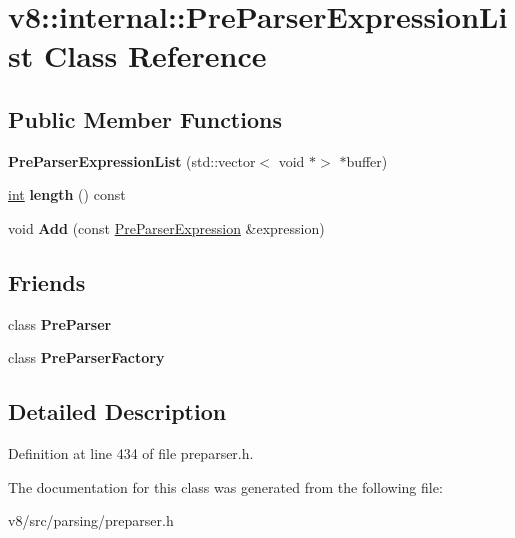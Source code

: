 \hypertarget{classv8_1_1internal_1_1PreParserExpressionList}{}\section{v8\+:\+:internal\+:\+:Pre\+Parser\+Expression\+List Class Reference}
\label{classv8_1_1internal_1_1PreParserExpressionList}
\subsection*{Public Member Functions}
\begin{DoxyCompactItemize}
\item 
\mbox{\label{classv8_1_1internal_1_1PreParserExpressionList_aeef6d4b676e7e901998833e398c2a8e5}} 
{\bfseries Pre\+Parser\+Expression\+List} (std\+::vector$<$ void $\ast$$>$ $\ast$buffer)
\item 
\mbox{\label{classv8_1_1internal_1_1PreParserExpressionList_a19a86b4ca6891e4630e51596bcaff12b}} 
\mbox{\hyperlink{classint}{int}} {\bfseries length} () const
\item 
\mbox{\label{classv8_1_1internal_1_1PreParserExpressionList_ace1a577f4e780212bdad5538dff61331}} 
void {\bfseries Add} (const \mbox{\hyperlink{classv8_1_1internal_1_1PreParserExpression}{Pre\+Parser\+Expression}} \&expression)
\end{DoxyCompactItemize}
\subsection*{Friends}
\begin{DoxyCompactItemize}
\item 
\mbox{\label{classv8_1_1internal_1_1PreParserExpressionList_aa52dc67118bf11b5e290e7675de340f2}} 
class {\bfseries Pre\+Parser}
\item 
\mbox{\label{classv8_1_1internal_1_1PreParserExpressionList_a352c2e06be1f10680f445e4e33e04c1c}} 
class {\bfseries Pre\+Parser\+Factory}
\end{DoxyCompactItemize}


\subsection{Detailed Description}


Definition at line 434 of file preparser.\+h.



The documentation for this class was generated from the following file\+:\begin{DoxyCompactItemize}
\item 
v8/src/parsing/preparser.\+h\end{DoxyCompactItemize}
